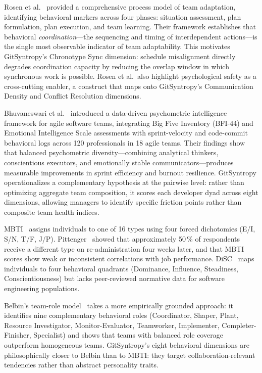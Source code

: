 \documentclass[conference]{IEEEtran}
\begin{document}
Rosen et al.~\cite{rosen2011} provided a comprehensive process model
of team adaptation, identifying behavioral markers across four
phases: situation assessment, plan formulation, plan execution, and
team learning.  Their framework establishes that behavioral
\emph{coordination}---the sequencing and timing of interdependent
actions---is the single most observable indicator of team
adaptability.  This motivates GitSyntropy's Chronotype Sync
dimension: schedule misalignment directly degrades coordination
capacity by reducing the overlap window in which synchronous work
is possible.  Rosen et al.\ also highlight psychological safety as
a cross-cutting enabler, a construct that maps onto GitSyntropy's
Communication Density and Conflict Resolution dimensions.

Bhuvaneswari et al.~\cite{bhuvaneswari2025} introduced a
data-driven psychometric intelligence framework for agile software
teams, integrating Big Five Inventory (BFI-44) and Emotional
Intelligence Scale assessments with sprint-velocity and code-commit
behavioral logs across 120 professionals in 18 agile teams.  Their
findings show that balanced psychometric diversity---combining
analytical thinkers, conscientious executors, and emotionally stable
communicators---produces measurable improvements in sprint efficiency
and burnout resilience.  GitSyntropy operationalizes a complementary
hypothesis at the pairwise level: rather than optimizing aggregate
team composition, it scores each developer dyad across eight
dimensions, allowing managers to identify specific friction points
rather than composite team health indices.

MBTI~\cite{myers1943} assigns individuals to one of 16 types using
four forced dichotomies (E/I, S/N, T/F, J/P).  Pittenger~\cite{pittenger1993}
showed that approximately 50\,\% of respondents receive a different
type on re-administration four weeks later, and that MBTI
scores show weak or inconsistent correlations with job performance.
DiSC~\cite{marston1928} maps individuals to four behavioral quadrants
(Dominance, Influence, Steadiness, Conscientiousness) but lacks
peer-reviewed normative data for software engineering populations.

Belbin's team-role model~\cite{belbin1981} takes a more empirically
grounded approach: it identifies nine complementary behavioral roles
(Coordinator, Shaper, Plant, Resource Investigator, Monitor-Evaluator,
Teamworker, Implementer, Completer-Finisher, Specialist) and shows
that teams with balanced role coverage outperform homogeneous teams.
GitSyntropy's eight behavioral dimensions are philosophically closer
to Belbin than to MBTI: they target collaboration-relevant tendencies
rather than abstract personality traits.
\end{document}
